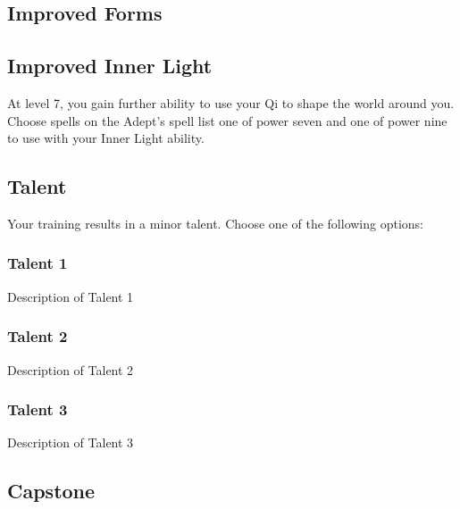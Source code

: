 \subsection*{Improved Forms}
\lipsum[1]

\subsection*{Improved Inner Light}
At level 7, you gain further ability to use your Qi to shape the world around you. Choose spells on the Adept's spell list one of power seven and one of power nine to use with your Inner Light ability. 

\vspace{.1 in}

\subsection*{Talent}
Your training results in a minor talent. Choose one of the following options:

\subsubsection{Talent 1}
Description of Talent 1

\subsubsection{Talent 2}
Description of Talent 2

\subsubsection{Talent 3}
Description of Talent 3

\vspace{.1 in}

\subsection*{Capstone}
\lipsum[1]